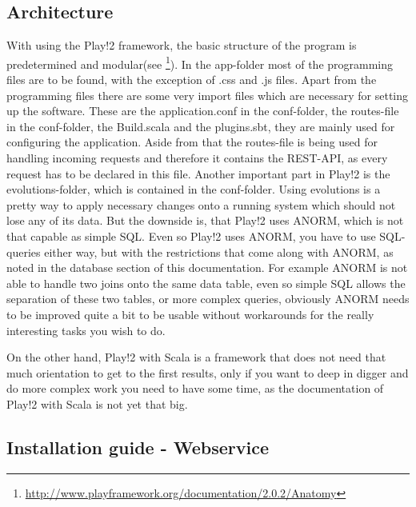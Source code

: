 \subsection{Architecture}\label{ssec:WebArchitecture}

With using the Play!2 framework, the basic structure of the program is predetermined and modular(see
\footnote{\url{http://www.playframework.org/documentation/2.0.2/Anatomy}}).
In the app-folder most of the programming files are to be found, with the exception of .css and .js files.
Apart from the programming files there are some very import files which are necessary for setting up the software.
These are the application.conf in the conf-folder, the routes-file in the conf-folder, the Build.scala and the plugins.sbt,
they are mainly used for configuring the application. Aside from that the routes-file is being used for handling incoming
requests and therefore it contains the REST-API, as every request has to be declared in this file.
Another important part in Play!2 is the evolutions-folder, which is contained in the conf-folder. Using evolutions is a pretty
way to apply necessary changes onto a running system which should not lose any of its data. But the downside is, that Play!2 uses
ANORM, which is not that capable as simple SQL. Even so Play!2 uses ANORM, you have to use SQL-queries either way, but with the
restrictions that come along with ANORM, as noted in the database section of this documentation.
For example ANORM is not able to handle two joins onto the same data table, even so simple SQL allows the separation of these
two tables, or more complex queries, obviously ANORM needs to be improved quite a bit to be usable without workarounds for the
really interesting tasks you wish to do.\newline

On the other hand, Play!2 with Scala is a framework that does not need that much orientation to get to the first results, only if
you want to deep in digger and do more complex work you need to have some time, as the documentation of Play!2 with Scala is not
yet that big.

\subsection{Installation guide - Webservice}\label{ssec:WebInst}

